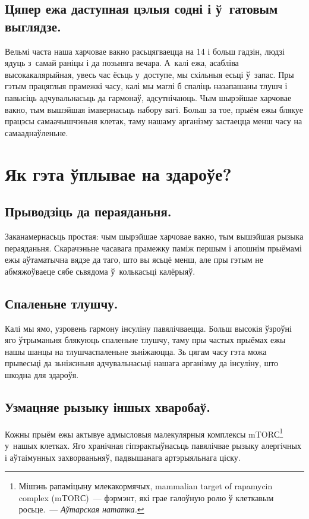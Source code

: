 \subsection{Цяпер ежа даступная цэлыя содні і ў~гатовым выглядзе.}

Вельмі часта наша харчовае вакно расьцягваецца на 14 і больш гадзін, людзі ядуць з~самай раніцы і да позьняга вечара. А~калі ежа, асабліва высокакалярыйная, увесь час ёсьць у~доступе, мы схільныя есьці ў~запас. Пры гэтым працяглыя прамежкі часу, калі мы маглі б спаліць назапашаны тлушч і павысіць адчувальнасьць да гармонаў, адсутнічаюць. Чым шырэйшае харчовае вакно, тым вышэйшая імавернасьць набору вагі. Больш за тое, прыём ежы блякуе працэсы самаачышчэньня клетак, таму нашаму арганізму застаецца менш часу на самааднаўленьне.

\section{Як гэта ўплывае на здароўе?}

\subsection{Прыводзіць да пераяданьня.}
Заканамернасьць простая: чым шырэйшае харчовае вакно, тым вышэйшая рызыка пераяданьня. Скарачэньне часавага прамежку паміж першым і апошнім прыёмамі ежы аўтаматычна вядзе да таго, што вы ясьцё менш, але пры гэтым не абмяжоўваеце сябе сьвядома ў~колькасьці калёрыяў.

\subsection{Спаленьне тлушчу.}
Калі мы ямо, узровень гармону інсуліну павялічваецца. Больш высокія ўзроўні яго ўтрыманьня блякуюць спаленьне тлушчу, таму пры частых прыёмах ежы нашы шанцы на тлушчаспаленьне зьніжаюцца. Зь цягам часу гэта можа прывесьці да зьніжэньня адчувальнасьці нашага арганізму да інсуліну, што шкодна для здароўя.

\subsection{Узмацняе рызыку іншых хваробаў.}
Кожны прыём ежы актывуе адмысловыя малекулярныя комплексы mTORС\footnote{Мішэнь рапаміцыну млекакормячых, mammalian target of rapamycin
complex (mTORС)~--- фэрмэнт, які грае галоўную ролю ў клеткавым 
росьце.~--- \emph{Аўтарская нататка.}} у~нашых клетках. Яго хранічная гіпэрактыўнасьць павялічвае рызыку алергічных і аўтаімунных захворваньняў, падвышанага артэрыяльнага ціску.

